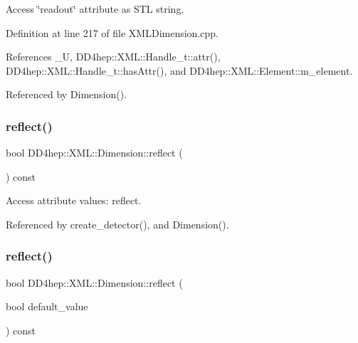 Access \char`\"{}readout\char`\"{} attribute as S\+TL string. 



Definition at line 217 of file X\+M\+L\+Dimension.\+cpp.



References \+\_\+U, D\+D4hep\+::\+X\+M\+L\+::\+Handle\+\_\+t\+::attr(), D\+D4hep\+::\+X\+M\+L\+::\+Handle\+\_\+t\+::has\+Attr(), and D\+D4hep\+::\+X\+M\+L\+::\+Element\+::m\+\_\+element.



Referenced by Dimension().

\hypertarget{struct_d_d4hep_1_1_x_m_l_1_1_dimension_a4e98c1133276f1ef0e555493b0031206}{}\label{struct_d_d4hep_1_1_x_m_l_1_1_dimension_a4e98c1133276f1ef0e555493b0031206} 
\subsubsection{\texorpdfstring{reflect()}{reflect()}\hspace{0.1cm}{\footnotesize\ttfamily [1/2]}}
{\footnotesize\ttfamily bool D\+D4hep\+::\+X\+M\+L\+::\+Dimension\+::reflect (\begin{DoxyParamCaption}{ }\end{DoxyParamCaption}) const}



Access attribute values\+: reflect. 



Referenced by create\+\_\+detector(), and Dimension().

\hypertarget{struct_d_d4hep_1_1_x_m_l_1_1_dimension_a69f28e5a5c066527b922577e8ae269bd}{}\label{struct_d_d4hep_1_1_x_m_l_1_1_dimension_a69f28e5a5c066527b922577e8ae269bd} 
\subsubsection{\texorpdfstring{reflect()}{reflect()}\hspace{0.1cm}{\footnotesize\ttfamily [2/2]}}
{\footnotesize\ttfamily bool D\+D4hep\+::\+X\+M\+L\+::\+Dimension\+::reflect (\begin{DoxyParamCaption}\item[{bool}]{default\+\_\+value }\end{DoxyParamCaption}) const}



